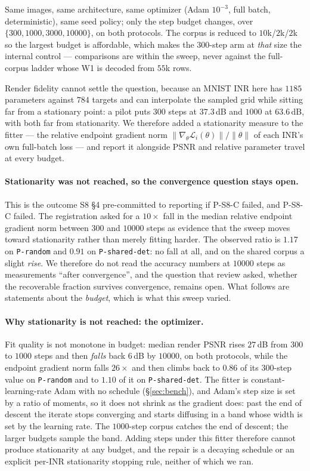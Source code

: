 \documentclass[10pt,twocolumn,letterpaper]{article}
\theoremstyle{definition}
\begin{document}
Same images, same architecture, same optimizer (Adam $10^{-3}$, full batch, deterministic), same
seed policy; only the step budget changes, over $\{300, 1000, 3000, 10000\}$, on both protocols. The
corpus is reduced to $10$k/$2$k/$2$k so the largest budget is affordable, which makes the
$300$-step arm at \emph{that} size the internal control --- comparisons are within the sweep, never
against the full-corpus ladder whose W1 is decoded from $55$k rows.

Render fidelity cannot settle the question, because an MNIST INR here has $1185$ parameters against
$784$ targets and can interpolate the sampled grid while sitting far from a stationary point: a
pilot puts $300$ steps at $37.3$\,dB and $1000$ at $63.6$\,dB, with both far from stationarity. We
therefore added a stationarity measure to the fitter --- the relative endpoint gradient norm
$\|\nabla_\theta \mathcal L_i(\theta)\|/\|\theta\|$ of each INR's own full-batch loss --- and report
it alongside PSNR and relative parameter travel at every budget.



\paragraph{Stationarity was not reached, so the convergence question stays open.} This is the outcome S8 §4 pre-committed to reporting if P-S8-C failed, and P-S8-C failed.
The registration asked for a $10\times$ fall in the median relative endpoint gradient norm between
$300$ and $10000$ steps as evidence that the sweep moves toward stationarity rather than merely
fitting harder. The observed ratio is $1.17$ on \texttt{P-random} and $0.91$ on
\texttt{P-shared-det}: no fall at all, and on the shared corpus a slight \emph{rise}. We therefore
do not read the accuracy numbers at $10000$ steps as measurements ``after convergence'', and the
question that review asked, whether the recoverable fraction survives convergence, remains
open. What follows are statements about the \emph{budget}, which is what this sweep varied.

\paragraph{Why stationarity is not reached: the optimizer.} Fit
quality is not monotone in budget: median render PSNR rises $27$\,dB from $300$ to $1000$ steps and
then \emph{falls} back $6$\,dB by $10000$, on both protocols, while the endpoint gradient norm falls
$26\times$ and then climbs back to $0.86$ of its $300$-step value on \texttt{P-random} and to
$1.10$ of it on \texttt{P-shared-det}. The fitter is constant-learning-rate Adam
with no schedule (\S\ref{sec:bench}), and Adam's step size is set by a ratio of moments, so it
does not shrink as the gradient does: past the end of descent the iterate stops converging and
starts diffusing in a band whose width is set by the learning rate. The $1000$-step corpus catches
the end of descent; the larger budgets sample the band. Adding steps under this fitter therefore
cannot produce stationarity at any budget, and the repair is a decaying schedule or an explicit
per-INR stationarity stopping rule, neither of which we ran.
\end{document}
